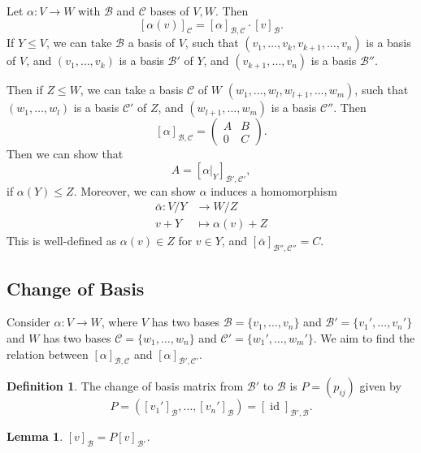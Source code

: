 \documentclass[12pt]{article}
\DeclareMathOperator{\id}{id}
\newtheorem{lemma}{Lemma}[section]
\theoremstyle{definition}
\newtheorem{definition}{Definition}[section]
\theoremstyle{remark}
\begin{document}
Let $\alpha : V \to W$ with $\mathcal{B}$ and $\mathcal{C}$ bases of $V, W$. Then
\[
	[\alpha(v)]_{\mathcal{C}} = [\alpha]_{\mathcal{B}, \mathcal{C}} \cdot [v]_{\mathcal{B}}
.\]
If $Y \leq V$, we can take $\mathcal{B}$ a basis of $V$, such that $(v_1, \ldots, v_k, v_{k+1}, \ldots, v_n)$ is a basis of $V$, and $(v_1, \ldots, v_k)$ is a basis $\mathcal{B}'$ of $Y$, and $(v_{k+1}, \ldots, v_n)$ is a basis $\mathcal{B}''$.

Then if $Z \leq W$, we can take a basis $\mathcal{C}$ of $W$ $(w_1, \ldots, w_l, w_{l+1}, \ldots, w_m)$, such that $(w_1, \ldots, w_l)$ is a basis $\mathcal{C}'$ of $Z$, and $(w_{l+1}, \ldots, w_m)$ is a basis $\mathcal{C}''$. Then
\[
	[\alpha]_{\mathcal{B}, \mathcal{C}} =
	\begin{pmatrix}
		A & B \\
		0 & C
	\end{pmatrix}
.\]
Then we can show that
\[
	A = [\alpha|_{Y}]_{\mathcal{B}', \mathcal{C}'}
,\]
if $\alpha(Y) \leq Z$. Moreover, we can show $\alpha$ induces a homomorphism
\begin{align*}
	\bar \alpha : V / Y &\to W / Z \\
	v + Y &\mapsto \alpha(v) + Z
\end{align*}
This is well-defined as $\alpha(v) \in Z$ for $v \in Y$, and $[\bar \alpha]_{\mathcal{B}'', \mathcal{C}''} = C$.

\subsection{Change of Basis}%
\label{sub:change_of_basis}

Consider $\alpha : V \to W$, where $V$ has two bases $\mathcal{B} = \{v_1, \ldots, v_n\}$ and $\mathcal{B}' = \{v_1', \ldots, v_n'\}$ and $W$ has two bases $\mathcal{C} = \{w_1, \ldots, w_n\}$ and $\mathcal{C}' = \{w_1', \ldots, w_m'\}$. We aim to find the relation between $[\alpha]_{\mathcal{B}, \mathcal{C}}$ and $[\alpha]_{\mathcal{B}', \mathcal{C}'}$.

\begin{definition}
	The change of basis matrix from $\mathcal{B}'$ to $\mathcal{B}$ is $P = (p_{ij})$ given by
	\[
		P = ([v_1']_{\mathcal{B}}, \ldots, [v_n']_{\mathcal{B}}) = [\id]_{\mathcal{B}', \mathcal{B}}
	.\]
\end{definition}

\begin{lemma}
	$[v]_{\mathcal{B}} = P[v]_{\mathcal{B}'}$.
\end{lemma}
\end{document}
